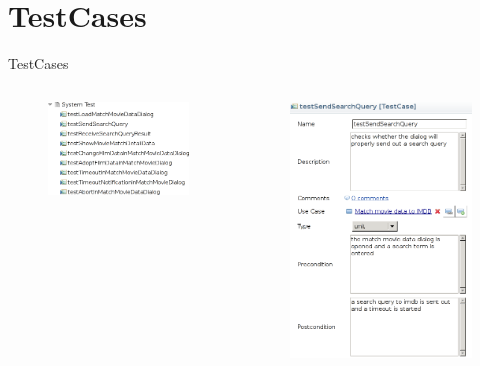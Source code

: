 \documentclass{beamer} %
\begin{document}
	\section{TestCases}
	\begin{frame}{TestCases}
		\begin{columns}[t]
			\begin{column}{.5\linewidth}
				\begin{figure}[H]
					\centering
					\includegraphics[width=\linewidth]{test-cases.png}
				\end{figure}
			\end{column}
			\begin{column}{.5\linewidth}
				\begin{figure}[H]
					\centering
					\includegraphics[height=.7\textheight]{testSendSearchQuery.png}

\end{figure}
\end{column}
\end{columns}
\end{frame}
\end{document}
